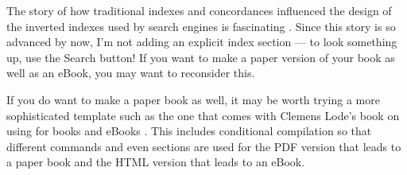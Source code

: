 The story of how traditional indexes and concordances influenced the design of the inverted
indexes used by search engines is fascinating \citep[Ch 1]{witten1999gigabytes}.
Since this story is so advanced by now, I'm not adding an explicit index section ---
to look something up, use the Search button! If you want to make a paper
version of your book as well as an eBook, you may want to reconsider this.

If you do want to make a paper book as well, it may be worth trying a
more sophisticated template such as the one that comes with Clemens
Lode's book on using \latex for books and eBooks \citep{lode2019better}.
This includes conditional compilation so that different commands and even sections are used
for the PDF version that leads to a paper book and the HTML version that leads to an eBook.
